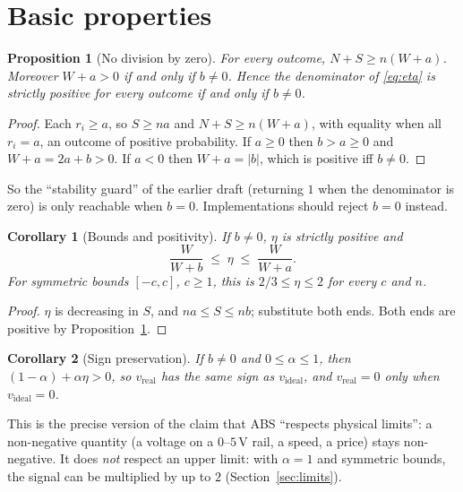 \documentclass[10pt,a4paper]{article}
\newtheorem{proposition}{Proposition}
\newtheorem{corollary}{Corollary}
\theoremstyle{definition}
\theoremstyle{remark}
\begin{document}
\section{Basic properties}\label{sec:props}

\begin{proposition}[No division by zero]\label{prop:denom}
For every outcome, $N+S\ge n(W+a)$. Moreover $W+a>0$ if and only if $b\neq0$. Hence the
denominator of \eqref{eq:eta} is strictly positive for every outcome if and only if $b\ne0$.
\end{proposition}
\begin{proof}
Each $r_i\ge a$, so $S\ge na$ and $N+S\ge n(W+a)$, with equality when all $r_i=a$, an
outcome of positive probability. If $a\ge0$ then $b>a\ge0$ and $W+a=2a+b>0$. If $a<0$ then
$W+a=|b|$, which is positive iff $b\ne0$.
\end{proof}

So the ``stability guard'' of the earlier draft (returning $1$ when the denominator is zero)
is only reachable when $b=0$. Implementations should reject $b=0$ instead.

\begin{corollary}[Bounds and positivity]\label{cor:bounds}
If $b\ne0$, $\eta$ is strictly positive and
\begin{equation}
\frac{W}{W+b}\;\le\;\eta\;\le\;\frac{W}{W+a}.
\end{equation}
For symmetric bounds $[-c,c]$, $c\ge1$, this is $2/3\le\eta\le2$ for every $c$ and $n$.
\end{corollary}
\begin{proof}
$\eta$ is decreasing in $S$, and $na\le S\le nb$; substitute both ends. Both ends are positive by
Proposition~\ref{prop:denom}.
\end{proof}

\begin{corollary}[Sign preservation]
If $b\ne0$ and $0\le\alpha\le1$, then $(1-\alpha)+\alpha\eta>0$, so $v_{\text{real}}$ has the
same sign as $v_{\text{ideal}}$, and $v_{\text{real}}=0$ only when $v_{\text{ideal}}=0$.
\end{corollary}

This is the precise version of the claim that ABS ``respects physical limits'': a
non-negative quantity (a voltage on a $0$--$5$\,V rail, a speed, a price) stays
non-negative. It does \emph{not} respect an upper limit: with $\alpha=1$ and symmetric
bounds, the signal can be multiplied by up to $2$ (Section~\ref{sec:limits}).
\end{document}
